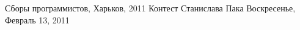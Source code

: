 \documentclass[11pt,a4paper,oneside]{article}
\begin{document}
\renewcommand{\t}[1]{\ifmmode{\mathtt{#1}}\else{\texttt{#1}}\fi}




%




\contest
{Сборы программистов, Харьков, 2011}%
{Контест Станислава Пака}%
{Воскресенье, Февраль 13, 2011}%
\newcommand{\inputproblem}[1]{}

\inputproblem{orange_cutting}
\inputproblem{convex_hull3}
\end{document}
